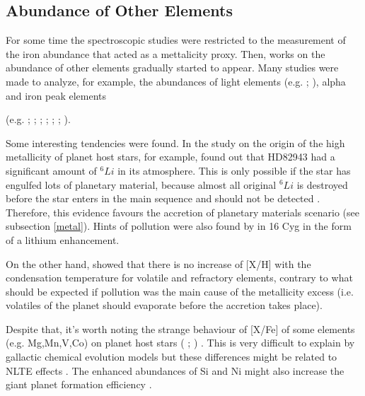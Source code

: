\documentclass[dvips,12pt,a4paper]{report}
\begin{document}

\subsection {Abundance of Other Elements} %
\label {others}

For some time the spectroscopic studies were restricted to the measurement of the iron abundance that acted as a mettalicity proxy. Then, works on the abundance of other elements gradually started to appear.
Many studies were made to analyze, for example, the abundances of light elements (e.g. \citeauthor{Sandquist-2002} \citeyear{Sandquist-2002}; \citeauthor{Israelian-2003} \citeyear{Israelian-2003}), alpha and iron peak elements {(e.g.  \citeauthor{Gonzalez-2001} \citeyear{Gonzalez-2001}; \citeauthor{Takeda-2001} \citeyear{Takeda-2001}; \citeauthor{Ecuvillon-2004b} \citeyear{Ecuvillon-2004b}; \citeauthor{Fischer-2005} \citeyear{Fischer-2005}; \citeauthor{Bodaghee-2003} \citeyear{Bodaghee-2003}; \citeauthor{Beirao-2005} \citeyear{Beirao-2005}; \citeauthor{Gilli-2006} \citeyear{Gilli-2006}). 

Some interesting tendencies were found. In the study on the origin of the high metallicity of planet host stars, for example, \citet{Israelian-2003} found out that HD82943 had a significant amount of $^6Li$ in its atmosphere. This is only possible if the star has engulfed lots of planetary material, because almost all original $^6Li$ is destroyed before the star enters in the main sequence and should not be detected \citep{Sandquist-2002}. Therefore, this evidence favours the accretion of planetary materials scenario (see subsection \ref{metal}). Hints of pollution were also found by \citet{Laws-2001} in 16 Cyg  in the form of a lithium enhancement.

On the other hand, \citet{Ecuvillon-2006b} showed that there is no increase of [X/H] with the condensation temperature for volatile and refractory elements, contrary to what should be expected if pollution was the main cause of the metallicity excess (i.e. volatiles of the planet should evaporate before the accretion takes place). 

Despite that, it's worth noting the strange behaviour of [X/Fe] of some elements (e.g. Mg,Mn,V,Co) on planet host stars (\citeauthor{Bodaghee-2003} \citeyear{Bodaghee-2003}; \citeauthor{Gilli-2006} \citeyear{Gilli-2006}) . This is very difficult to explain by gallactic chemical evolution models but these differences might be related to NLTE effects \citep{Bodaghee-2003}. The enhanced abundances of Si and Ni might also increase the giant planet formation efficiency \citep{Robinson-2006}.

}
\end{document}
